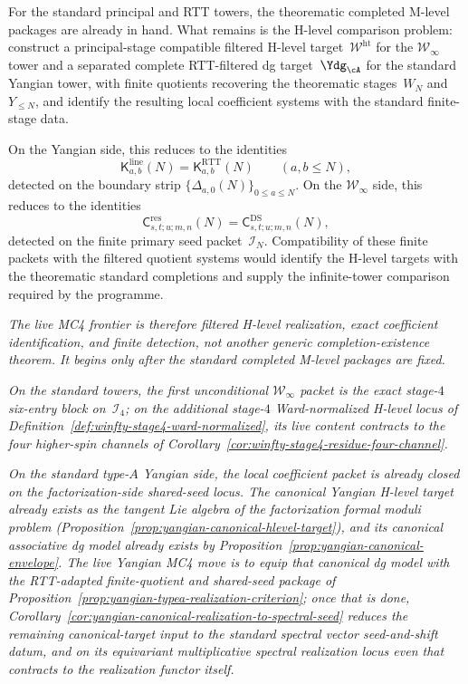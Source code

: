 \begin{conjecture}
\label{conj:master-infinite-generator}
\ClaimStatusConjectured{}
For the standard principal and RTT towers, the theorematic completed
M-level packages are already in hand.  What remains is the H-level
comparison problem: construct a principal-stage compatible filtered
H-level target~$\mathcal{W}^{\mathrm{ht}}$ for the
$\mathcal{W}_\infty$ tower and a separated complete RTT-filtered dg
target~$\Ydg_{\cA}$ for the standard Yangian tower, with finite
quotients recovering the theorematic stages~$W_N$ and~$Y_{\le N}$, and
identify the resulting local coefficient systems with the standard
finite-stage data.

On the Yangian side, this reduces to the identities
\[
\mathsf{K}^{\mathrm{line}}_{a,b}(N)
=\mathsf{K}^{\mathrm{RTT}}_{a,b}(N)
\qquad (a,b\le N),
\]
detected on the boundary strip
$\{\Delta_{a,0}(N)\}_{0\le a\le N}$.
On the $\mathcal{W}_\infty$ side, this reduces to the identities
\[
\mathsf{C}^{\mathrm{res}}_{s,t;u;m,n}(N)
=\mathsf{C}^{\mathrm{DS}}_{s,t;u;m,n}(N),
\]
detected on the finite primary seed packet~$\mathcal{I}_N$.
Compatibility of these finite packets with the filtered quotient systems
would identify the H-level targets with the theorematic standard
completions and supply the infinite-tower comparison required by the
programme.

\emph{The live MC4 frontier is therefore filtered H-level realization,
exact coefficient identification, and finite detection, not another
generic completion-existence theorem.  It begins only after the
standard completed M-level packages are fixed.}

\emph{On the standard towers, the first unconditional
$\mathcal{W}_\infty$ packet is the exact stage-$4$ six-entry block
on~$\mathcal{I}_4$; on the additional stage-$4$ Ward-normalized
H-level locus of
Definition~\ref{def:winfty-stage4-ward-normalized}, its live content
contracts to the four higher-spin channels of
Corollary~\ref{cor:winfty-stage4-residue-four-channel}.}

\emph{On the
standard type-$A$ Yangian side, the local coefficient packet is already
closed on the factorization-side shared-seed locus.  The canonical
Yangian H-level target already exists as the tangent Lie algebra of the
factorization formal moduli problem
\textup{(}Proposition~\textup{\ref{prop:yangian-canonical-hlevel-target}}\textup{)},
and its canonical associative dg model already exists by
Proposition~\ref{prop:yangian-canonical-envelope}.  The live Yangian
MC4 move is to equip that canonical dg model with the RTT-adapted
finite-quotient and shared-seed package of
Proposition~\ref{prop:yangian-typea-realization-criterion}; once that
is done,
Corollary~\ref{cor:yangian-canonical-realization-to-spectral-seed}
reduces the remaining canonical-target input to the standard spectral
vector seed-and-shift datum, and on its equivariant multiplicative
spectral realization locus even that contracts to the realization
functor itself.}


\end{conjecture}
